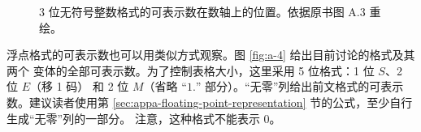 \begin{figure}[htbp]
  \centering
  \caption{3 位无符号整数格式的可表示数在数轴上的位置。依据原书图 A.3 重绘。}
  \label{fig:a-3}
\end{figure}

浮点格式的可表示数也可以用类似方式观察。图 \ref{fig:a-4} 给出目前讨论的格式及其两个
变体的全部可表示数。为了控制表格大小，这里采用 5 位格式：1 位 $S$、2 位 $E$（移 1 码）
和 2 位 $M$（省略 ``$1.$'' 部分）。“无零”列给出前文格式的可表示数。建议读者使用第
\ref{sec:appa-floating-point-representation} 节的公式，至少自行生成“无零”列的一部分。
注意，这种格式不能表示 0。

